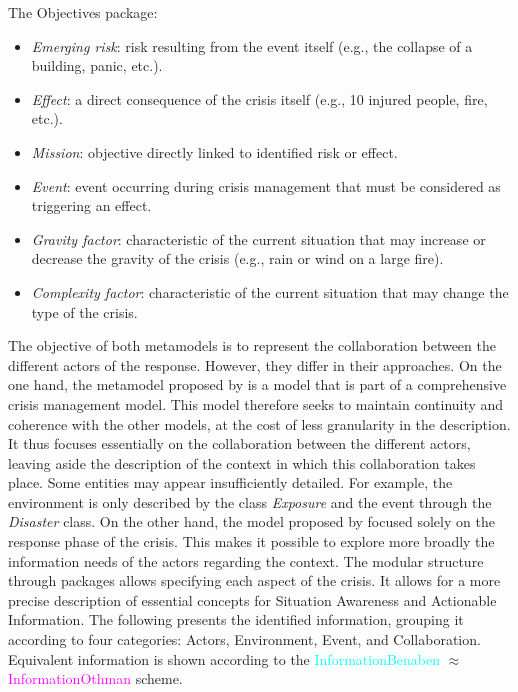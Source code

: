 The Objectives package:
\begin{itemize}
    \item \textit{Emerging risk}: risk resulting from the event itself (e.g., the collapse of a building, panic, etc.).
    \item \textit{Effect}: a direct consequence of the crisis itself (e.g., 10 injured people, fire, etc.).
    \item \textit{Mission}: objective directly linked to identified risk or effect.
    \item \textit{Event}: event occurring during crisis management that must be considered as triggering an effect.
    \item \textit{Gravity factor}: characteristic of the current situation that may increase or decrease the gravity of the crisis (e.g., rain or wind on a large fire).
    \item \textit{Complexity factor}: characteristic of the current situation that may change the type of the crisis.
\end{itemize}

The objective of both metamodels is to represent the collaboration between the different actors of the response.
However, they differ in their approaches.
On the one hand, the metamodel proposed by \textcite{othmanDevelopmentValidationDisaster2014} is a model that is part of a comprehensive crisis management model.
This model therefore seeks to maintain continuity and coherence with the other models, at the cost of less granularity in the description.
It thus focuses essentially on the collaboration between the different actors, leaving aside the description of the context in which this collaboration takes place.
Some entities may appear insufficiently detailed.
For example, the environment is only described by the class \textit{Exposure} and the event through the \textit{Disaster} class.
On the other hand, the model proposed by \textcite{benabenMetamodelKnowledgeManagement2016} focused solely on the response phase of the crisis.
This makes it possible to explore more broadly the information needs of the actors regarding the context.
The modular structure through packages allows specifying each aspect of the crisis.
It allows for a more precise description of essential concepts for Situation Awareness and Actionable Information.
The following presents the identified information, grouping it according to four categories: Actors, Environment, Event, and Collaboration.
Equivalent information is shown according to the \textcolor{cyan}{InformationBenaben} $\approx$ \textcolor{magenta}{InformationOthman} scheme.

